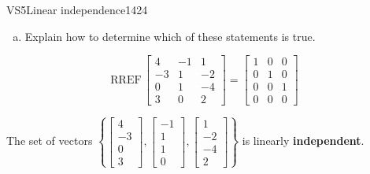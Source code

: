 \begin{exercise}{VS5}{Linear independence}{1424}
\begin{exerciseStatement}
\begin{enumerate}[(a)]
     
\item  

 Explain how to determine which of these statements is true. 

 
\end{enumerate}

     \end{exerciseStatement}
 \begin{exerciseAnswer} 

 \[
\mathrm{RREF}\, \left[\begin{array}{ccc}
4 & -1 & 1 \\
-3 & 1 & -2 \\
0 & 1 & -4 \\
3 & 0 & 2
\end{array}\right] = \left[\begin{array}{ccc}
1 & 0 & 0 \\
0 & 1 & 0 \\
0 & 0 & 1 \\
0 & 0 & 0
\end{array}\right]
            \] 

 

 The set of vectors \(\left\{ \left[\begin{array}{c}
4 \\
-3 \\
0 \\
3
\end{array}\right] , \left[\begin{array}{c}
-1 \\
1 \\
1 \\
0
\end{array}\right] , \left[\begin{array}{c}
1 \\
-2 \\
-4 \\
2
\end{array}\right] \right\}\) is linearly \textbf{independent}. 

 \end{exerciseAnswer}
 \end{exercise}


